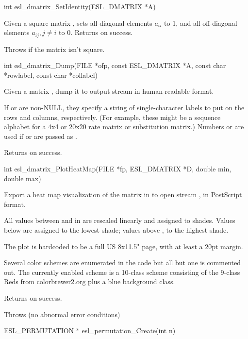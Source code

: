 \begin{sreapi}
\hypertarget{func:esl_dmatrix_SetIdentity()}
{\item[int esl\_dmatrix\_SetIdentity(ESL\_DMATRIX *A)]}

Given a square matrix , sets all diagonal elements 
$a_{ii}$ to 1, and all off-diagonal elements $a_{ij},
j \ne i$ to 0. Returns  on success.

Throws  if the matrix isn't square.


\hypertarget{func:esl_dmatrix_Dump()}
{\item[int esl\_dmatrix\_Dump(FILE *ofp, const ESL\_DMATRIX *A, const char *rowlabel, const char *collabel)]}

Given a matrix , dump it to output stream  in human-readable
format.

If  or  are non-NULL, they specify a
string of single-character labels to put on the rows and
columns, respectively. (For example, these might be a
sequence alphabet for a 4x4 or 20x20 rate matrix or
substitution matrix.)  Numbers  or  are
used if  or  are passed as .

Returns  on success.


\hypertarget{func:esl_dmatrix_PlotHeatMap()}
{\item[int esl\_dmatrix\_PlotHeatMap(FILE *fp, ESL\_DMATRIX *D, double min, double max)]}

Export a heat map visualization of the matrix in 
to open stream , in PostScript format. 

All values between  and  in  are rescaled
linearly and assigned to shades. Values below 
are assigned to the lowest shade; values above , to
the highest shade.

The plot is hardcoded to be a full US 8x11.5" page,
with at least a 20pt margin.

Several color schemes are enumerated in the code
but all but one is commented out. The currently enabled
scheme is a 10-class scheme consisting of the 9-class
Reds from colorbrewer2.org plus a blue background class.

Returns  on success.

Throws (no abnormal error conditions)


\hypertarget{func:esl_permutation_Create()}
{\item[ESL\_PERMUTATION * esl\_permutation\_Create(int n)]}


\end{sreapi}
